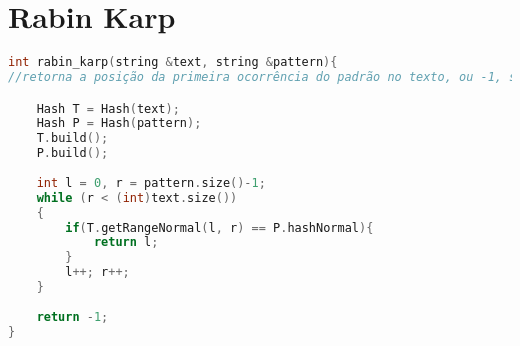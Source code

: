 \documentclass[12pt,a4paper,twoside]{report}
\begin{document}
\section{Rabin Karp}
\noindent\begin{lstlisting}[caption=Rabin Karp,language=C++]
int rabin_karp(string &text, string &pattern){
//retorna a posição da primeira ocorrência do padrão no texto, ou -1, se não existir

    Hash T = Hash(text);
    Hash P = Hash(pattern);
    T.build();
    P.build();
     
    int l = 0, r = pattern.size()-1;
    while (r < (int)text.size())
    {
        if(T.getRangeNormal(l, r) == P.hashNormal){
            return l;
        }
        l++; r++;
    }
     
    return -1;
}
\end{lstlisting}
\end{document}
